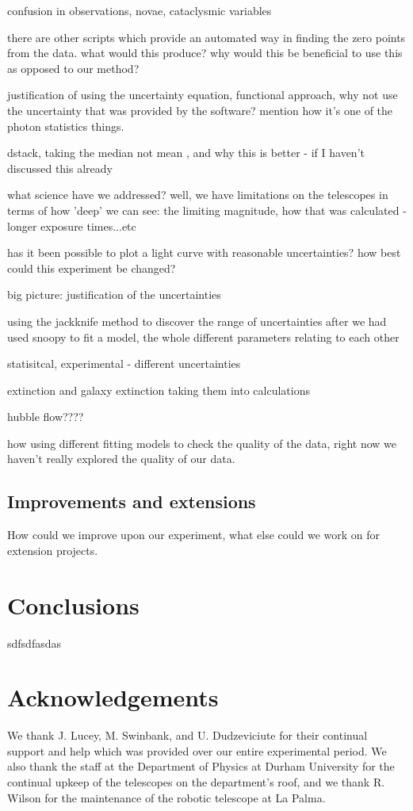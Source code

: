 \documentclass[twocolumn]{revtex4}
\begin{document}
confusion in observations, novae, cataclysmic variables 

there are other scripts which provide an automated way in finding the zero points from the data. what would this produce? why would this be beneficial to use this as opposed to our method?

justification of using the uncertainty equation, functional approach, why not use the uncertainty that was provided by the software? mention how it's one of the photon statistics things.

dstack, taking the median not mean , and why this is better - if I haven't discussed this already

what science have we addressed? well, we have limitations on the telescopes in terms of how 'deep' we can see:  the limiting magnitude, how that was calculated - longer exposure times...etc

has it been possible to plot a light curve with reasonable uncertainties? how best could this experiment be changed? 

big picture: justification of the uncertainties 

using the jackknife method to discover the range of uncertainties after we had used snoopy to fit a model, the whole different parameters relating to each other

statisitcal, experimental - different uncertainties

extinction and galaxy extinction taking them into calculations

hubble flow????

how using different fitting models to check the quality of the data, right now we haven't really explored the quality of our data. 

\subsection{Improvements and extensions}
How could we improve upon our experiment, what else could we work on for extension projects.

\vspace{-5ex}
\section{Conclusions}
\label{conclusions}
\vspace{-2ex}

sdfsdfasdas

\vspace{-5ex}
\section*{Acknowledgements}
\vspace{-2ex}
We thank J. Lucey, M. Swinbank, and U. Dudzeviciute for their continual support and help which was provided over our entire experimental period. We also thank the staff at the Department of Physics at Durham University for the continual upkeep of the telescopes on the department's roof, and we thank R. Wilson for the maintenance of the robotic telescope at La Palma.
\end{document}
